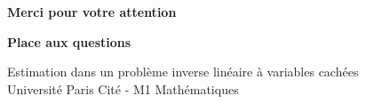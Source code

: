 {
\begin{frame}[plain]
    \centering
    \vspace{2cm}
    \Huge \textcolor{Cream}{\textbf{Merci pour votre attention}}
    
    \vspace{0.8cm}
    \large \textcolor{SoftGold}{\textbf{Place aux questions}}
    
    \vspace{1.5cm}
    \footnotesize \textcolor{Cream}{Estimation dans un problème inverse linéaire à variables cachées \\ Université Paris Cité - M1 Mathématiques}
\end{frame}
}